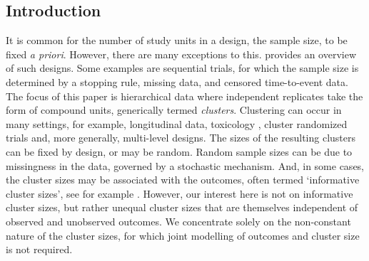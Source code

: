 \documentclass[11pt,a5paper,twoside]{book}
\begin{document}
\label{sec_ar1}

\subsection{Introduction}
\label{secintroar1}

It is common for the number of study units in a design, the sample size, to be fixed {\em a priori\/}. However,
there are many exceptions to this. \cite{molenberghs2014random} provides an overview of such designs. Some examples are sequential trials, for which the sample size is determined by a stopping rule, missing data, and censored time-to-event data.
The focus of this paper is hierarchical data where independent replicates take the form of compound units, generically termed {\em clusters}.  Clustering can occur in many settings, for example, longitudinal data, toxicology \citep{aerts2002}, cluster randomized trials and, more generally, multi-level designs. The sizes of the resulting clusters can be fixed by design, or may be random. Random sample sizes can be due to missingness in the data, governed by a stochastic mechanism. And, in some cases, the cluster sizes may be associated with the outcomes, often termed `informative cluster sizes', see for example \cite{williamson2003marginal, benhin2005mean, hoffman2001, cong2007marginal, chiang2008efficient, wang2011inference,aerts2011incomplete}. However, our interest here is not on informative cluster sizes, but rather unequal cluster sizes that are themselves independent of observed and unobserved outcomes. We concentrate solely on the non-constant nature of the cluster sizes, for which joint modelling of outcomes and cluster size is not required.
\end{document}
